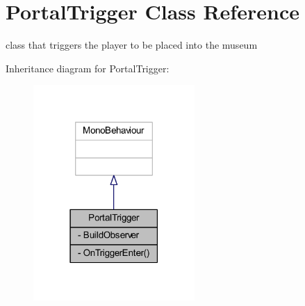 \hypertarget{class_portal_trigger}{}\section{Portal\+Trigger Class Reference}
\label{class_portal_trigger}


class that triggers the player to be placed into the museum  




Inheritance diagram for Portal\+Trigger\+:
\nopagebreak
\begin{figure}[H]
\begin{center}
\leavevmode
\includegraphics[width=174pt]{class_portal_trigger__inherit__graph}
\end{center}
\end{figure}


